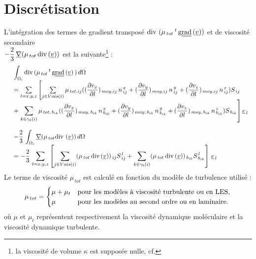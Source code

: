 \section*{Discrétisation}
L'intégration des termes de gradient transposé
 $\text{div}\,\,(\mu_{\,tot}\,^t\,\text{g}\underline{\underline{{\text{rad}}}}\,(\underline{v}))$ et de viscosité
secondaire \\
$-\displaystyle \frac{2}{3}\,\underline{\nabla} (\mu_{\,tot}\,\text{div}\,(\underline{v}))$ est la suivante\footnote{la viscosité de volume
$\kappa$ est supposée nulle, cf. } :
\begin{equation}\notag
\begin{array}{llll}
&\displaystyle \int_{\Omega_i}\text{div}\, (\mu_{\,tot}
\,^t\,\text{g}\underline{\underline{{\text{rad}}}}\,(\underline{v})\,)\,d\Omega \\
&= \sum\limits_{l=x,y,z}\left[ \sum\limits_{j \in
Vois(i)} \mu_{\,tot,ij} ((\displaystyle \frac {\partial v_x}{\partial
l})_{\,moy,ij}\,n_{\,ij}^{\,x} +(\frac {\partial v_y}
 {\partial l})_{\,moy,ij}\,n_{\,ij}^{\,y}+ \displaystyle(\frac {\partial v_z}
{\partial l})_{\,moy,ij}\,n_{\,ij}^{\,z}) S_{\,ij}\right.\\
&+\left.\displaystyle \sum\limits_{k \in \gamma_b(i)} \mu_{\,tot,\,b_{ik}}
((\frac {\partial v_x}{\partial l})_{\,moy,\,b_{ik}}\,n_{\,b_{ik}}^{\,x} +(\frac
{\partial v_y}{\partial l})_{\,moy,\,b_{ik}}\,n_{\,b_{ik}}^{\,y}+
\displaystyle(\frac {\partial v_z}{\partial
l})_{\,moy,\,b_{ik}}\,n_{\,b_{ik}}^{\,z}) S_{\,b_{ik}}\right] \underline
{e}_{\,l} \\\\
&-\displaystyle \frac{2}{3}\,\int_{\Omega_i}\underline{\nabla} (\mu_{\,tot} \text{div}\,\,(\underline{v}))
\,d\Omega \\
&= -\displaystyle \frac{2}{3}\,\sum\limits_{l=x,y,z}\left[\sum\limits_{j \in Vois(i)}(\mu_{\,tot}\,\text{div}\,(\underline{v}))_{\,ij} S_{\,ij}^{\,l} + \displaystyle \sum_{k \in \gamma_b(i)}(\mu_{\,tot}\,\text{div}\,(\underline{v}))_{\,b_{ik}} S_{\,b_{ik}}^{\,l}\right]\,\underline {e}_{\,l}
\end{array}
\end{equation}
Le terme de viscosité $\mu_{\,tot}$ est calculé en fonction du modèle de turbulence utilisé :
\begin{equation}\notag
\mu_{\,tot}=
\begin{cases}
\mu + \mu_t & \text{pour les modèles à viscosité turbulente ou en LES}, \\
\mu& \text{pour les modèles au second ordre ou en laminaire}.
\end{cases}
\end{equation}
où $\mu$ et $\mu_t$ représentent respectivement la viscosité dynamique moléculaire et la viscosité dynamique turbulente.

